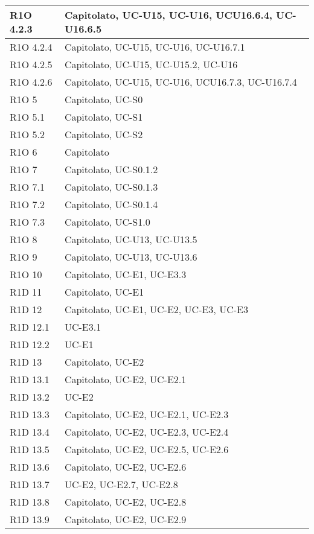 \begin{center}
\begin{longtable}{ | l | p{8cm} | }
    R1O 4.2.3 & Capitolato, UC-U15, UC-U16, UCU16.6.4, UC-U16.6.5 \\ \hline
    R1O 4.2.4 & Capitolato, UC-U15, UC-U16, UC-U16.7.1 \\ \hline
    R1O 4.2.5 & Capitolato, UC-U15, UC-U15.2, UC-U16 \\ \hline
    R1O 4.2.6 & Capitolato, UC-U15, UC-U16, UCU16.7.3, UC-U16.7.4 \\ \hline
    R1O 5 & Capitolato, UC-S0 \\ \hline
    R1O 5.1 & Capitolato, UC-S1 \\ \hline
    R1O 5.2 & Capitolato, UC-S2 \\ \hline
    R1O 6 & Capitolato \\ \hline
    R1O 7 & Capitolato, UC-S0.1.2 \\ \hline
    R1O 7.1 & Capitolato, UC-S0.1.3 \\ \hline
    R1O 7.2 & Capitolato, UC-S0.1.4 \\ \hline
    R1O 7.3 & Capitolato, UC-S1.0 \\ \hline
    R1O 8 & Capitolato, UC-U13, UC-U13.5 \\ \hline
    R1O 9 & Capitolato, UC-U13, UC-U13.6 \\ \hline
    R1O 10 & Capitolato, UC-E1, UC-E3.3 \\ \hline
    R1D 11 & Capitolato, UC-E1 \\ \hline
    R1D 12 & Capitolato, UC-E1, UC-E2, UC-E3, UC-E3  \\ \hline
    R1D 12.1 & UC-E3.1  \\ \hline
    R1D 12.2 & UC-E1  \\ \hline
    R1D 13 & Capitolato, UC-E2 \\ \hline
    R1D 13.1 & Capitolato, UC-E2, UC-E2.1  \\ \hline
    R1D 13.2 & UC-E2 \\ \hline
    R1D 13.3 & Capitolato, UC-E2, UC-E2.1, UC-E2.3 \\ \hline
    R1D 13.4 & Capitolato, UC-E2, UC-E2.3, UC-E2.4  \\ \hline
    R1D 13.5 & Capitolato, UC-E2, UC-E2.5, UC-E2.6 \\ \hline
    R1D 13.6 & Capitolato, UC-E2, UC-E2.6 \\ \hline
    R1D 13.7 & UC-E2, UC-E2.7, UC-E2.8 \\ \hline
    R1D 13.8 & Capitolato, UC-E2, UC-E2.8 \\ \hline
    R1D 13.9 & Capitolato, UC-E2, UC-E2.9 \\ \hline

\end{longtable}
\end{center}
